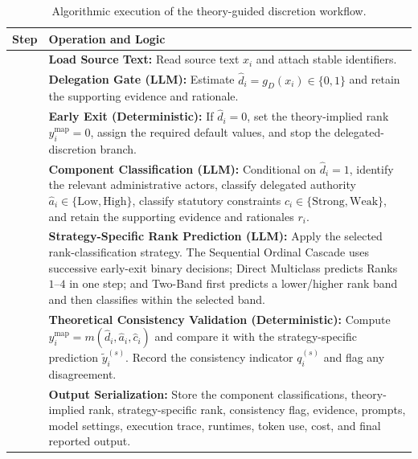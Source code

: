 \documentclass[runningheads]{llncs}
\begin{document}
\begin{table}[t]
\caption{Algorithmic execution of the theory-guided discretion workflow.}
\label{tab:algorithm}
\centering
\footnotesize
\begin{tabular}{@{}>{\raggedright\arraybackslash}p{}>{\raggedright\arraybackslash}p{}@{}}
\hline
\textbf{Step} & \textbf{Operation and Logic} \\
\hline

1 &
\textbf{Load Source Text:}
Read source text \(x_i\) and attach
stable identifiers. \\

2 &
\textbf{Delegation Gate (LLM):}
Estimate
\(\hat d_i=g_D(x_i)\in\{0,1\}\)
and retain the supporting evidence and rationale. \\

3 &
\textbf{Early Exit (Deterministic):}
If \(\hat d_i=0\), set the theory-implied rank
\(y_i^{\mathrm{map}}=0\), assign the required default values, and stop
the delegated-discretion branch. \\

4 &
\textbf{Component Classification (LLM):}
Conditional on \(\hat d_i=1\), identify the relevant administrative
actors, classify delegated authority
\(\hat a_i\in\{\mathrm{Low},\mathrm{High}\}\), classify statutory
constraints
\(\hat c_i\in\{\mathrm{Strong},\mathrm{Weak}\}\), and retain the
supporting evidence and rationales \(r_i\). \\

5 &
\textbf{Strategy-Specific Rank Prediction (LLM):}
Apply the selected rank-classification strategy. The Sequential
Ordinal Cascade uses
successive early-exit binary decisions; Direct Multiclass predicts
Ranks \(1\)--\(4\) in one step; and Two-Band first predicts a
lower/higher rank band and then classifies within the selected band. \\

6 &
\textbf{Theoretical Consistency Validation (Deterministic):}
Compute
\(y_i^{\mathrm{map}}=m(\hat d_i,\hat a_i,\hat c_i)\)
and compare it with the strategy-specific prediction
\(\tilde y_i^{(s)}\). Record the consistency indicator
\(q_i^{(s)}\) and flag any disagreement. \\

7 &
\textbf{Output Serialization:}
Store the component classifications, theory-implied rank,
strategy-specific rank, consistency flag, evidence, prompts, model
settings, execution trace, runtimes, token use, cost, and final
reported output. \\

\hline
\end{tabular}
\end{table}
\end{document}
